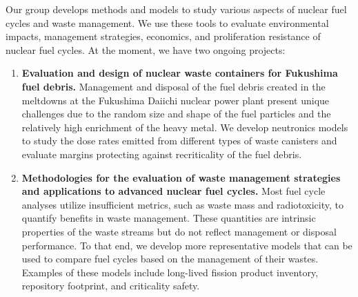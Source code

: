 



Our group develops methods and models to study various aspects of nuclear fuel cycles and waste management. 
We use these tools to evaluate environmental impacts, management strategies, economics, and proliferation resistance of nuclear fuel cycles. 
At the moment, we have two ongoing projects:
\begin{enumerate}
	\item \textbf{Evaluation and design of nuclear waste containers for Fukushima fuel debris.}
	Management and disposal of the fuel debris created in the meltdowns at the Fukushima Daiichi nuclear power plant present unique challenges due to the random size and shape of the fuel particles and the relatively high enrichment of the heavy metal.
	We develop neutronics models to study the dose rates emitted from different types of waste canisters and evaluate margins protecting against recriticality of the fuel debris.
	\item \textbf{Methodologies for the evaluation of waste management strategies and applications to advanced nuclear fuel cycles.}
	Most fuel cycle analyses utilize insufficient metrics, such as waste mass and radiotoxicity, to quantify benefits in waste management. 
	These quantities are intrinsic properties of the waste streams but do not reflect management or disposal performance. 
	To that end, we develop more representative models that can be used to compare fuel cycles based on the management of their wastes. 
	Examples of these models include long-lived fission product inventory, repository footprint, and criticality safety.
\end{enumerate}

